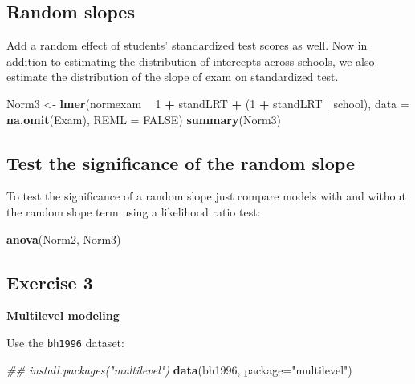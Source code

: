 \documentclass[
]{book}
\newenvironment{Shaded}{\begin{snugshade}}{\end{snugshade}}
\newcommand{\CommentTok}[1]{\textcolor[rgb]{0.56,0.35,0.01}{\textit{#1}}}
\newcommand{\DataTypeTok}[1]{\textcolor[rgb]{0.13,0.29,0.53}{#1}}
\newcommand{\DecValTok}[1]{\textcolor[rgb]{0.00,0.00,0.81}{#1}}
\newcommand{\KeywordTok}[1]{\textcolor[rgb]{0.13,0.29,0.53}{\textbf{#1}}}
\newcommand{\NormalTok}[1]{#1}
\newcommand{\OperatorTok}[1]{\textcolor[rgb]{0.81,0.36,0.00}{\textbf{#1}}}
\newcommand{\OtherTok}[1]{\textcolor[rgb]{0.56,0.35,0.01}{#1}}
\newcommand{\StringTok}[1]{\textcolor[rgb]{0.31,0.60,0.02}{#1}}
\begin{document}
\hypertarget{random-slopes}{%
\subsection{Random slopes}\label{random-slopes}}

Add a random effect of students' standardized test scores as well. Now in addition to estimating the distribution of intercepts across schools, we also estimate the distribution of the slope of exam on standardized test.

\begin{Shaded}
\begin{Highlighting}[]
\NormalTok{  Norm3 <-}\StringTok{ }\KeywordTok{lmer}\NormalTok{(normexam }\OperatorTok{~}\StringTok{ }\DecValTok{1} \OperatorTok{+}\StringTok{ }\NormalTok{standLRT }\OperatorTok{+}\StringTok{ }\NormalTok{(}\DecValTok{1} \OperatorTok{+}\StringTok{ }\NormalTok{standLRT }\OperatorTok{|}\StringTok{ }\NormalTok{school), }
                \DataTypeTok{data =} \KeywordTok{na.omit}\NormalTok{(Exam), }\DataTypeTok{REML =} \OtherTok{FALSE}\NormalTok{) }
  \KeywordTok{summary}\NormalTok{(Norm3) }
\end{Highlighting}
\end{Shaded}

\hypertarget{test-the-significance-of-the-random-slope}{%
\subsection{Test the significance of the random slope}\label{test-the-significance-of-the-random-slope}}

To test the significance of a random slope just compare models with and without the random slope term using a likelihood ratio test:

\begin{Shaded}
\begin{Highlighting}[]
  \KeywordTok{anova}\NormalTok{(Norm2, Norm3) }
\end{Highlighting}
\end{Shaded}

\hypertarget{exercise-3-1}{%
\subsection{Exercise 3}\label{exercise-3-1}}

\textbf{Multilevel modeling}

Use the \texttt{bh1996} dataset:

\begin{Shaded}
\begin{Highlighting}[]
\CommentTok{## install.packages("multilevel")}
\KeywordTok{data}\NormalTok{(bh1996, }\DataTypeTok{package=}\StringTok{"multilevel"}\NormalTok{)}
\end{Highlighting}
\end{Shaded}
\end{document}
